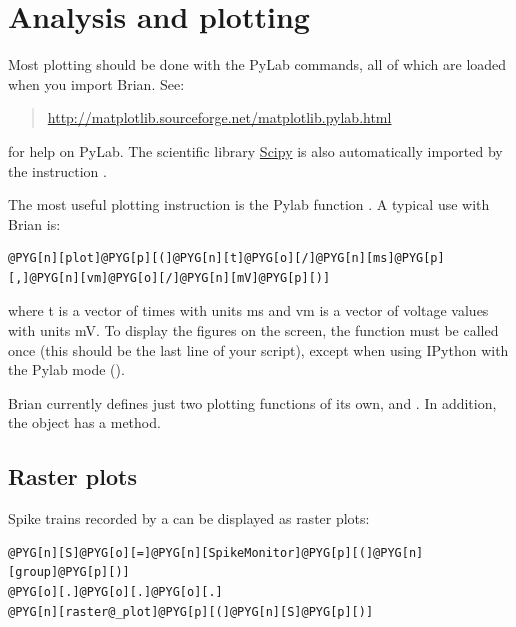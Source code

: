 \documentclass[letterpaper,10pt,english]{manual}
\begin{document}
\resetcurrentobjects
\hypertarget{--doc-analysis}{}

\hypertarget{index-0}{}\section{Analysis and plotting}
Most plotting should be done with the PyLab commands, all of
which are loaded when you import Brian. See:
\begin{quote}

\href{http://matplotlib.sourceforge.net/matplotlib.pylab.html}{http://matplotlib.sourceforge.net/matplotlib.pylab.html}
\end{quote}

for help on PyLab. The scientific library \href{http://www.scipy.org}{Scipy} is also automatically
imported by the instruction .

The most useful plotting instruction is the Pylab function . A typical use with Brian is:

\begin{Verbatim}[commandchars=@\[\]]
@PYG[n][plot]@PYG[p][(]@PYG[n][t]@PYG[o][/]@PYG[n][ms]@PYG[p][,]@PYG[n][vm]@PYG[o][/]@PYG[n][mV]@PYG[p][)]
\end{Verbatim}

where t is a vector of times with units ms and vm is a vector of voltage values with units mV.
To display the figures on the screen, the function  must be called once (this should be the
last line of your script), except when using IPython with the Pylab mode ().

Brian currently defines just two plotting functions of its own,
\hyperlink{brian.raster_plot}{} and \hyperlink{brian.hist_plot}{}. In addition, the \hyperlink{brian.StateMonitor}{}
object has a \hyperlink{brian.StateMonitor.plot}{} method.


\subsection{Raster plots}

Spike trains recorded by a \hyperlink{brian.SpikeMonitor}{} can be displayed as raster plots:

\begin{Verbatim}[commandchars=@\[\]]
@PYG[n][S]@PYG[o][=]@PYG[n][SpikeMonitor]@PYG[p][(]@PYG[n][group]@PYG[p][)]
@PYG[o][.]@PYG[o][.]@PYG[o][.]
@PYG[n][raster@_plot]@PYG[p][(]@PYG[n][S]@PYG[p][)]
\end{Verbatim}
\end{document}
